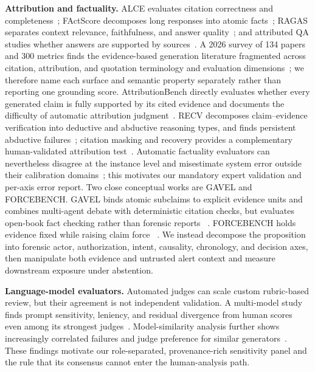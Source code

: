 \documentclass[letterpaper,twocolumn,10pt]{article}
\begin{document}
\textbf{Attribution and factuality.}  ALCE evaluates citation correctness and
completeness~\cite{gao2023alce}; FActScore decomposes long responses into atomic
facts~\cite{min2023factscore}; RAGAS separates context relevance,
faithfulness, and answer quality~\cite{es2024ragas}; and attributed QA studies
whether answers are supported by sources~\cite{bohnet2022attributed}.
A 2026 survey of 134 papers and 300 metrics finds the evidence-based generation
literature fragmented across citation, attribution, and quotation terminology
and evaluation dimensions~\cite{schreieder2026survey}; we therefore name each
surface and semantic property separately rather than reporting one grounding
score.
AttributionBench directly evaluates whether every generated claim is fully
supported by its cited evidence and documents the difficulty of automatic
attribution judgment~\cite{li2024attributionbench}.  RECV decomposes
claim--evidence verification into deductive and abductive reasoning types, and
finds persistent abductive failures~\cite{dougrezlewis2025recv}; citation
masking and recovery provides a complementary human-validated attribution
test~\cite{xing2025evidence}.  Automatic factuality evaluators can nevertheless
disagree at the instance level and misestimate system error outside their
calibration domains~\cite{godbole2025verify}; this motivates our mandatory
expert validation and per-axis error report.  Two close conceptual works are
GAVEL and FORCEBENCH.  GAVEL binds atomic subclaims to explicit evidence units
and combines multi-agent debate with deterministic citation checks, but
evaluates open-book fact checking rather than forensic reports
~\cite{xu2026gavel}.  FORCEBENCH holds evidence fixed while raising claim force
~\cite{qian2026forcebench}.  We instead decompose the proposition into
forensic actor, authorization, intent, causality, chronology, and decision
axes, then manipulate both evidence and untrusted alert context and measure
downstream exposure under abstention.

\textbf{Language-model evaluators.}  Automated judges can scale custom
rubric-based review, but their agreement is not independent validation.  A
multi-model study finds prompt sensitivity, leniency, and residual divergence
from human scores even among its strongest judges~\cite{thakur2025judges}.
Model-similarity analysis further shows increasingly correlated failures and
judge preference for similar generators~\cite{goel2025great}.  These findings
motivate our role-separated, provenance-rich sensitivity panel and the rule
that its consensus cannot enter the human-analysis path.
\end{document}
